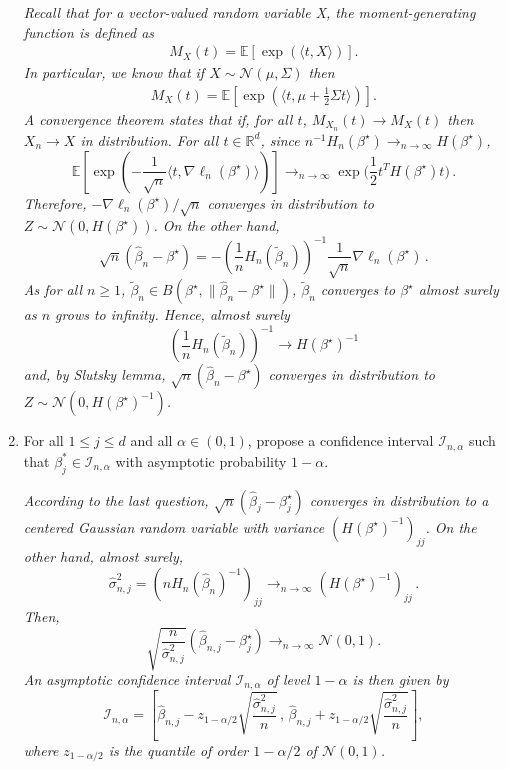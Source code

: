 \documentclass[a4paper,10pt,fleqn]{article}
\newcommand{\eqsp}{\,}
\newcommand{\rset}{\ensuremath{\mathbb{R}}}
\newcommand{\1}{\ensuremath{\mathbbm{1}}}
\newcommand{\bE}{\mathbb{E}}
\begin{document}
\begin{enumerate}
\vspace{.2cm}

{\em
 Recall that for a vector-valued random variable X, the moment-generating function is defined as 
\begin{align*}%
M_X(t) = \bE \left[ \exp\left( \langle t, X \rangle \right) \right].
\end{align*}
In particular, we know that if $X \sim \mathcal{N}(\mu, \Sigma)$ then 
\begin{align*}
M_X(t) = \bE \left[ \exp \left( \langle t, \mu + \frac{1}{2} \Sigma t \rangle \right) \right].
\end{align*}
A convergence theorem states that if, for all $t$, $M_{X_n}(t) \to M_X(t)$ then $X_n \to X$ in distribution. 
For all $t\in\rset^d$, since $n^{-1} H_n(\beta^{\star}) \to_{n\to \infty} H(\beta^{\star})$,
$$
\bE \left[ \exp\left( - \frac{1}{\sqrt{n}} \langle t, \nabla \ell_n(\beta^{\star}) \rangle \right) \right] \to_{n\to \infty}  \exp\Bigg( \frac{1}{2} t^T H(\beta^{\star}) t \Bigg)\eqsp.
$$
Therefore, $-\nabla \ell_n(\beta^{\star}) / \sqrt{n}$ converges in distribution to  $Z \sim \mathcal{N}(0, H(\beta^{\star}))$. On the other hand, 
$$
\sqrt{n} (\widehat{\beta}_n - \beta^{\star}) = - \left( \frac{1}{n} H_n(\tilde{\beta}_n) \right)^{-1} \frac{1}{\sqrt{n}} \nabla \ell_n(\beta^{\star})\eqsp.
$$
As for all $n\geqslant 1$, $\tilde{\beta}_n \in B(\beta^{\star}, \|\widehat{\beta}_n - \beta^{\star}\|)$, $\tilde{\beta}_n$ converges to  $\beta^{\star}$ almost surely as $n$ grows to infinity. Hence, almost surely
$$
\left( \frac{1}{n} H_n(\tilde{\beta}_n) \right)^{-1} \to H(\beta^{\star})^{-1}
$$
and, by Slutsky lemma, $\sqrt{n} (\widehat{\beta}_n - \beta^{\star})$  converges in distribution to  $Z \sim \mathcal{N}(0,  H(\beta^{\star})^{-1})$.
}
\item For all $1\leqslant j \leqslant d$ and all $\alpha\in(0,1)$, propose a confidence interval $\mathcal{I}_{n,\alpha}$ such that $\beta^*_{j}\in \mathcal{I}_{n,\alpha}$ with asymptotic probability $1-\alpha$.

\vspace{.2cm}

{\em
According to the last question, $\sqrt{n} ( \widehat{\beta}_j - \beta^{\star}_j) $ converges in distribution to a centered Gaussian random variable with variance $(H(\beta^{\star})^{-1})_{jj}$. On the other hand, almost surely,
$$
\widehat{\sigma}_{n,j}^2 = (n H_n(\widehat{\beta}_n)^{-1})_{jj} \to_{n\to \infty} (H(\beta^{\star})^{-1})_{jj}\eqsp.
$$
Then, 
$$
\sqrt{\frac{n}{\widehat{\sigma}_{n,j}^2}} (\widehat{\beta}_{n,j} - \beta^{\star}_j ) \to_{n\to \infty} \mathcal{N}(0,1).
$$
An asymptotic confidence interval $\mathcal{I}_{n,\alpha}$ of level $1-\alpha$ is then given by
$$
\mathcal{I}_{n,\alpha} = \left[ \widehat{\beta}_{n,j} - z_{1-\alpha/2} \sqrt{\frac{\widehat{\sigma}^2_{n,j}}{n}}\eqsp,\eqsp \widehat{\beta}_{n,j} + z_{1-\alpha/2} \sqrt{\frac{\widehat{\sigma}^2_{n,j}}{n}}  \right],
$$
where $z_{1- \alpha/2}$ is the quantile of order $1- \alpha/2$ of $\mathcal{N}(0, 1)$.
}
\end{enumerate}
\end{document}
